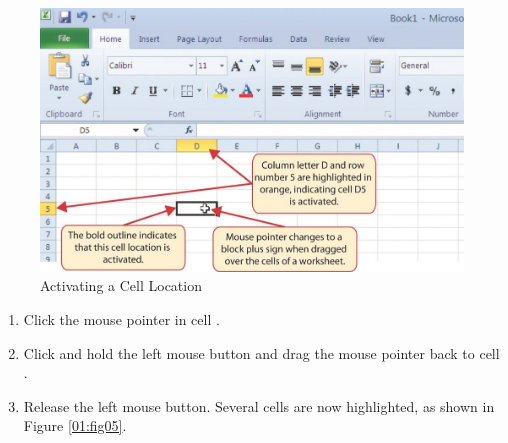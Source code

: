 \begin{figure}[H]
	\centering
	\includegraphics[width=\maxwidth{.95\linewidth}]{gfx/ch01_fig04}
	\caption{Activating a Cell Location}
	\label{01:fig04}
\end{figure}

\begin{enumbox}
	\begin{enumerate}
		\item Click the mouse pointer in cell .
		\item Click and hold the left mouse button and drag the mouse pointer back to cell .
		\item Release the left mouse button. Several cells are now highlighted, as shown in Figure \ref{01:fig05}.
	\end{enumerate}
\end{enumbox}

